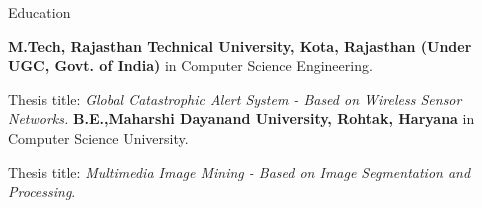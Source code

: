 \begin{rubric}{Education}

\entry*[2009 -- 2011]%
	\textbf{M.Tech, Rajasthan Technical University, Kota, Rajasthan (Under UGC, Govt. of India)} in Computer Science Engineering.
	\par Thesis title: \emph{Global Catastrophic Alert System - Based on Wireless Sensor Networks.}
%
\entry*[2005 -- 2009]%
	\textbf{B.E.,Maharshi Dayanand University, Rohtak, Haryana} in Computer Science University.\par
	Thesis title: \emph{Multimedia Image Mining - Based on Image Segmentation and Processing}.
\end{rubric}